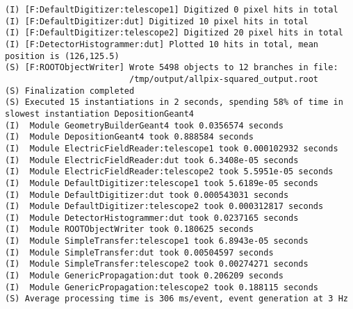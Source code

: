 \begin{lstlisting}[breaklines]
(I) [F:DefaultDigitizer:telescope1] Digitized 0 pixel hits in total
(I) [F:DefaultDigitizer:dut] Digitized 10 pixel hits in total
(I) [F:DefaultDigitizer:telescope2] Digitized 20 pixel hits in total
(I) [F:DetectorHistogrammer:dut] Plotted 10 hits in total, mean position is (126,125.5)
(S) [F:ROOTObjectWriter] Wrote 5498 objects to 12 branches in file:
                         /tmp/output/allpix-squared_output.root
(S) Finalization completed
(S) Executed 15 instantiations in 2 seconds, spending 58% of time in slowest instantiation DepositionGeant4
(I)  Module GeometryBuilderGeant4 took 0.0356574 seconds
(I)  Module DepositionGeant4 took 0.888584 seconds
(I)  Module ElectricFieldReader:telescope1 took 0.000102932 seconds
(I)  Module ElectricFieldReader:dut took 6.3408e-05 seconds
(I)  Module ElectricFieldReader:telescope2 took 5.5951e-05 seconds
(I)  Module DefaultDigitizer:telescope1 took 5.6189e-05 seconds
(I)  Module DefaultDigitizer:dut took 0.000543031 seconds
(I)  Module DefaultDigitizer:telescope2 took 0.000312817 seconds
(I)  Module DetectorHistogrammer:dut took 0.0237165 seconds
(I)  Module ROOTObjectWriter took 0.180625 seconds
(I)  Module SimpleTransfer:telescope1 took 6.8943e-05 seconds
(I)  Module SimpleTransfer:dut took 0.00504597 seconds
(I)  Module SimpleTransfer:telescope2 took 0.00274271 seconds
(I)  Module GenericPropagation:dut took 0.206209 seconds
(I)  Module GenericPropagation:telescope2 took 0.188115 seconds
(S) Average processing time is 306 ms/event, event generation at 3 Hz
\end{lstlisting}
